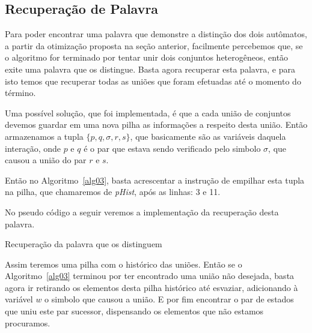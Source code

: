\documentclass[
	12pt,				%
	openany,
	oneside,
	a4paper,			%
	english,			%
	brazil				%
	]{abntex2}
\begin{document}
\subsection {Recuperação de Palavra}

  Para poder encontrar uma palavra que demonstre a distinção dos dois autômatos, a partir da otimização proposta na seção anterior, facilmente percebemos que, se o algoritmo for terminado por tentar unir dois conjuntos heterogêneos, então exite uma palavra que os distingue. Basta agora recuperar esta palavra, e para isto temos que recuperar todas as uniões que foram efetuadas até o momento do término.

  Uma possível solução, que foi implementada, é que a cada união de conjuntos devemos guardar em uma nova pilha as informações a respeito desta união. Então armazenamos a tupla $\{p, q, \sigma, r, s\}$, que basicamente são as variáveis daquela interação, onde $p$ e $q$ é o par que estava sendo verificado pelo simbolo $\sigma$, que causou a união do par $r$ e $s$.

  Então no Algoritmo~\ref{alg03}, basta acrescentar a instrução de empilhar esta tupla na pilha, que chamaremos de \emph{pHist}, após as linhas: 3 e 11.

  No pseudo código a seguir veremos a implementação da recuperação desta palavra.

  \begin{algorithm}[H]
    \caption{Recuperação da palavra que os distinguem}
    \label{alg04}
  \end{algorithm}


  Assim teremos uma pilha com o histórico das uniões. Então se o Algoritmo~\ref{alg03} terminou por ter encontrado uma união não desejada, basta agora ir retirando os elementos desta pilha histórico até esvaziar, adicionando à variável $w$ o simbolo que causou a união. E por fim encontrar o par de estados que uniu este par sucessor, dispensando os elementos que não estamos procuramos.
\end{document}
